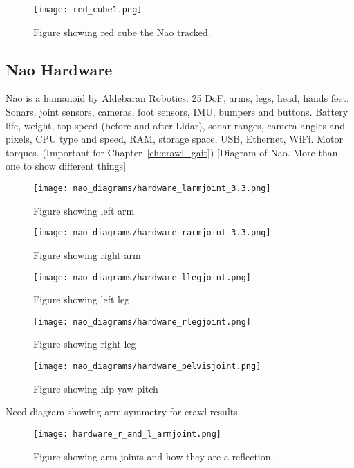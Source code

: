 \begin{figure}
\centering
\texttt{[image: red\_cube1.png]}
\caption{Figure showing red cube the Nao tracked.}
\label{fig:red_cube1}
\end{figure}

\subsection{Nao Hardware}
Nao is a humanoid by Aldebaran Robotics. 25 DoF, arms, legs, head, hands feet.
Sonars, joint sensors, cameras, foot sensors, IMU, bumpers and buttons.
Battery life, weight, top speed (before and after Lidar), sonar ranges, camera angles and pixels,
CPU type and speed, RAM, storage space, USB, Ethernet, WiFi.
Motor torques. (Important for Chapter~\ref{ch:crawl_gait})
[Diagram of Nao. More than one to show different things]

\begin{figure}
\centering
\texttt{[image: nao\_diagrams/hardware\_larmjoint\_3.3.png]}
\caption{Figure showing left arm}
\label{fig:nao_arm_joints_left1}
\end{figure}

\begin{figure}
\centering
\texttt{[image: nao\_diagrams/hardware\_rarmjoint\_3.3.png]}
\caption{Figure showing right arm}
\label{fig:nao_arm_joints_right1}
\end{figure}

\begin{figure}
\centering
\texttt{[image: nao\_diagrams/hardware\_llegjoint.png]}
\caption{Figure showing left leg}
\label{fig:nao_leg_joints_left1}
\end{figure}

\begin{figure}
\centering
\texttt{[image: nao\_diagrams/hardware\_rlegjoint.png]}
\caption{Figure showing right leg}
\label{fig:nao_leg_joints_right1}
\end{figure}

\begin{figure}
\centering
\texttt{[image: nao\_diagrams/hardware\_pelvisjoint.png]}
\caption{Figure showing hip yaw-pitch}
\label{fig:nao_hip_yawpitch1}
\end{figure}


Need diagram showing arm symmetry for crawl results. 
\begin{figure}
\centering
\texttt{[image: hardware\_r\_and\_l\_armjoint.png]}
\caption{Figure showing arm joints and how they are a reflection.}
\label{fig:nao_arm_joints_reflect1}
\end{figure}

